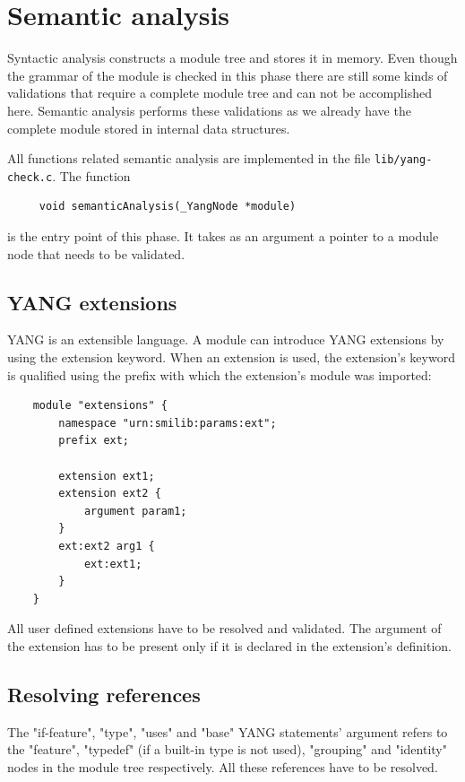 \documentclass[conference]{IEEEtran}
\begin{document}
\section{Semantic analysis}
Syntactic analysis constructs a module tree and stores it in memory. 
Even though the grammar of the module is checked in this phase there are still some kinds of validations that require a complete module tree
and can not be accomplished here. Semantic analysis performs these validations as we already have the complete module stored in internal data structures.

All functions related semantic analysis are implemented in the file \texttt{lib/yang-check.c}. The function
\small
\begin{verbatim}
     void semanticAnalysis(_YangNode *module)
\end{verbatim}
\normalsize
is the entry point of this phase. It takes as an argument a pointer to a module node that needs to be validated. 

\subsection{YANG extensions}
YANG is an extensible language. A module can introduce YANG extensions by using the extension keyword.
When an extension is used, the extension's keyword is qualified using the prefix with which the extension's module was imported:
\small
\begin{verbatim}
    module "extensions" {
        namespace "urn:smilib:params:ext";
        prefix ext;
        
        extension ext1;
        extension ext2 {
            argument param1;
        }
        ext:ext2 arg1 {
            ext:ext1;
        }
    }
\end{verbatim}
\normalsize

All user defined extensions have to be resolved and validated. The argument of the extension has to be present only if it is declared in the extension's definition. 

\subsection{Resolving references}
The "if-feature", "type", "uses" and "base" YANG statements' argument refers to the "feature", "typedef" (if a built-in type is not used), "grouping" and "identity"
nodes in the module tree respectively. All these references have to be resolved.   
\end{document}
